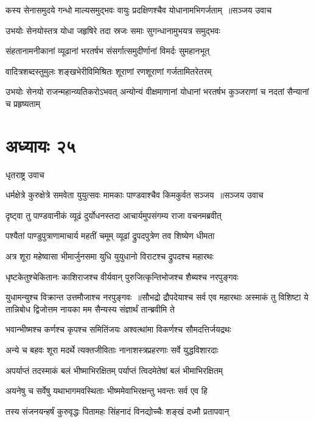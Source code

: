 \threelineshloka
{कस्य सेनासमुदये गन्धो माल्यसमुद्भवः}
{वायुः प्रदक्षिणश्चैव योधानामभिगर्जताम् ॥सञ्जय उवाच}
{}


\twolineshloka
{उभयोः सेनयोस्तत्र योधा जहृषिरे तदा}
{स्रजः समाः सुगन्धानामुभयत्र समुद्भवः}


\twolineshloka
{संहतानामनीकानां व्यूढानां भरतर्षभ}
{संसर्गात्समुदीर्णानां विमर्दः सुमहानभूत्}


\twolineshloka
{वादित्रशब्दस्तुमुलः शङ्खभेरीविमिश्रितः}
{शूराणां रणशूराणां गर्जतामितरेतरम्}


\threelineshloka
{उभयोः सेनयो राजन्महान्व्यतिकरोऽभवत्}
{अन्योन्यं वीक्षमाणानां योधानां भरतर्षभ}
{कुञ्जराणां च नदतां सैन्यानां च प्रहृष्यताम्}


\chapter{अध्यायः २५}
\twolineshloka
{धृतराष्ट्र उवाच}
{}


\threelineshloka
{धर्मक्षेत्रे कुरुक्षेत्रे समवेता युयुत्सवः}
{मामकाः पाण्डवाश्चैव किमकुर्वत सञ्जय ॥सञ्जय उवाच}
{}


\twolineshloka
{दृष्ट्वा तु पाण्डवानीकं व्यूढं दुर्योधनस्तदा}
{आचार्यमुपसंगम्य राजा वचनमब्रवीत्}


\twolineshloka
{पश्यैतां पाण्डुपुत्राणामाचार्य महतीं चमूम्}
{व्यूढां द्रुपदपुत्रेण तव शिष्येण धीमता}


\twolineshloka
{अत्र शूरा महेष्वासा भीमार्जुनसमा युधि}
{युयुधानो विराटश्च द्रुपदश्च महारथः}


\twolineshloka
{धृष्टकेतुश्चेकितानः काशिराजश्च वीर्यवान्}
{पुरुजित्कृन्तिभोजश्च शैब्यश्च नरपुङ्गवः}


युधामन्युश्च विक्रान्त उत्तमौजाश्च नरपुङ्गवः ॥सौभद्रो द्रौपदेयाश्च सर्व एव महारथाः
\twolineshloka
{अस्माकं तु विशिष्टा ये तान्निबोध द्विजोत्तम}
{नायका मम सैन्यस्य संज्ञार्थं तान्ब्रवीमि ते}


\twolineshloka
{भवान्भीष्मश्च कर्णश्च कृपश्च समितिंजयः}
{अश्वत्थांमा विकर्णश्च सौमदत्तिर्जयद्रथः}


\twolineshloka
{अन्ये च बहवः शूरा मदर्थे त्यक्तजीविताः}
{नानाशस्त्रप्रहरणाः सर्वे युद्धविशारदाः}


\twolineshloka
{अपर्याप्तं तदस्माकं बलं भीष्माभिरक्षितम्}
{पर्याप्तं त्विदमेतेषां बलं भीमाभिरक्षितम्}


\twolineshloka
{अयनेषु च सर्वेषु यथाभागमवस्थिताः}
{भीष्ममेवाभिरक्षन्तु भवन्तः सर्व एव हि}


\twolineshloka
{तस्य संजनयन्हर्षं कुरुवृद्धः पितामहः}
{सिंहनादं विनद्योच्चैः शङ्खं दध्मौ प्रतापवान्}



